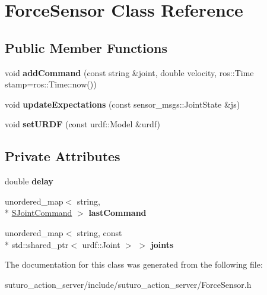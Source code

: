 \hypertarget{classForceSensor}{\section{Force\-Sensor Class Reference}
\label{classForceSensor}
}
\subsection*{Public Member Functions}
\begin{DoxyCompactItemize}
\item 
\hypertarget{classForceSensor_abbbed56bf9e344440a3ab892e26a3831}{void {\bfseries add\-Command} (const string \&joint, double velocity, ros\-::\-Time stamp=ros\-::\-Time\-::now())}\label{classForceSensor_abbbed56bf9e344440a3ab892e26a3831}

\item 
\hypertarget{classForceSensor_ab86600b22d6ea562f8e0236ba2d8bba5}{void {\bfseries update\-Expectations} (const sensor\-\_\-msgs\-::\-Joint\-State \&js)}\label{classForceSensor_ab86600b22d6ea562f8e0236ba2d8bba5}

\item 
\hypertarget{classForceSensor_a9d65a258b7cc1a5c35f5a005fbe6a598}{void {\bfseries set\-U\-R\-D\-F} (const urdf\-::\-Model \&urdf)}\label{classForceSensor_a9d65a258b7cc1a5c35f5a005fbe6a598}

\end{DoxyCompactItemize}
\subsection*{Private Attributes}
\begin{DoxyCompactItemize}
\item 
\hypertarget{classForceSensor_acc5f6f6150cfbec73dc44d66ff5efde3}{double {\bfseries delay}}\label{classForceSensor_acc5f6f6150cfbec73dc44d66ff5efde3}

\item 
\hypertarget{classForceSensor_a81f5f354fb5ecb55f27d99d966c56d2a}{unordered\-\_\-map$<$ string, \\*
\hyperlink{structSJointCommand}{S\-Joint\-Command} $>$ {\bfseries last\-Command}}\label{classForceSensor_a81f5f354fb5ecb55f27d99d966c56d2a}

\item 
\hypertarget{classForceSensor_a41b510e9bd91a1a673bd4531200801fa}{unordered\-\_\-map$<$ string, const \\*
std\-::shared\-\_\-ptr$<$ urdf\-::\-Joint $>$ $>$ {\bfseries joints}}\label{classForceSensor_a41b510e9bd91a1a673bd4531200801fa}

\end{DoxyCompactItemize}


The documentation for this class was generated from the following file\-:\begin{DoxyCompactItemize}
\item 
suturo\-\_\-action\-\_\-server/include/suturo\-\_\-action\-\_\-server/Force\-Sensor.\-h\end{DoxyCompactItemize}

